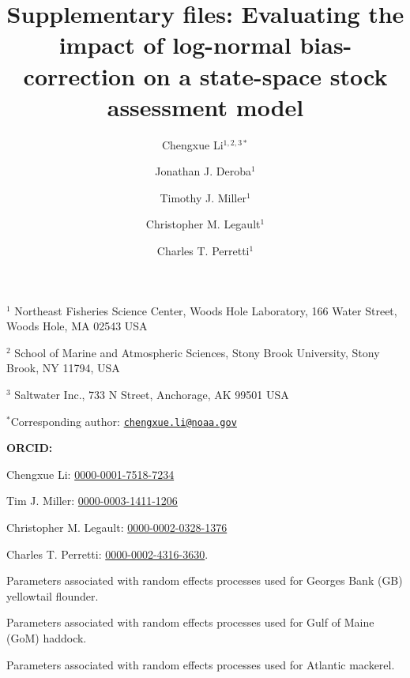 \documentclass[
  12pt,
]{article}
\title{Supplementary files: Evaluating the impact of log-normal
bias-correction on a state-space stock assessment model}
\author{Chengxue Li\(^{1,2,3*}\) \and Jonathan J.
Deroba\(^1\) \and Timothy J. Miller\(^1\) \and Christopher M.
Legault\(^1\) \and Charles T. Perretti\(^1\)}
\date{}
\begin{document}
\maketitle

\(^1\) Northeast Fisheries Science Center, Woods Hole Laboratory, 166
Water Street, Woods Hole, MA 02543 USA

\(^2\) School of Marine and Atmospheric Sciences, Stony Brook
University, Stony Brook, NY 11794, USA

\(^3\) Saltwater Inc., 733 N Street, Anchorage, AK 99501 USA

\(^*\)Corresponding author:
\href{mailto:chengxue.li@noaa.gov}{\nolinkurl{chengxue.li@noaa.gov}}

\vspace{0.5cm}

\textbf{ORCID:}

Chengxue Li:
\href{https://orcid.org/0000-0001-7518-7234}{0000-0001-7518-7234}

Tim J. Miller:
\href{https://orcid.org/0000-0003-1411-1206}{0000-0003-1411-1206}

Christopher M. Legault:
\href{https://orcid.org/0000-0002-0328-1376}{0000-0002-0328-1376}

Charles T. Perretti:
\href{https://orcid.org/0000-0002-4316-3630}{0000-0002-4316-3630}.

\pagebreak

\renewcommand{\thetable}{S\arabic{table}}
\setcounter{table}{0}

\begin{table}[H]
    \centering
    \caption{Parameters associated with random effects processes used for Georges Bank (GB) yellowtail flounder.}
    \label{supp_flounder_table}
    
\end{table}

\begin{table}[H]
    \centering
    \caption{Parameters associated with random effects processes used for Gulf of Maine (GoM) haddock.}
    \label{supp_haddock_table}
    
\end{table}

\begin{table}[H]
    \centering
    \caption{Parameters associated with random effects processes used for Atlantic mackerel.}
    \label{supp_mackerel_table}
    
\end{table}
\end{document}
